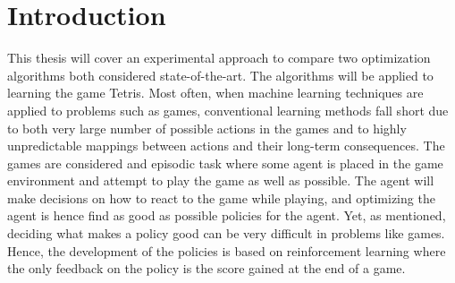 \section{Introduction \label{sec:intro}}

This thesis will cover an experimental approach 
to compare two optimization algorithms both considered 
state-of-the-art. The algorithms will be applied to 
learning the game Tetris. Most often, when machine learning
techniques are applied to problems such as games, conventional
learning methods fall short due to both  very large number of 
possible actions in the games and to highly unpredictable mappings 
between actions and their long-term consequences. The games 
are considered and episodic task where some agent is placed
in the game environment and attempt to play the game as well
as possible. The agent will make decisions on how to react 
to the game while playing, and optimizing the agent is hence 
find as good as possible policies for the agent. Yet, as mentioned,
deciding what makes a policy good can be very difficult in
problems like games. Hence, the development of the policies 
is based on reinforcement learning where the only feedback 
on the policy is the score gained at the end of a game.










